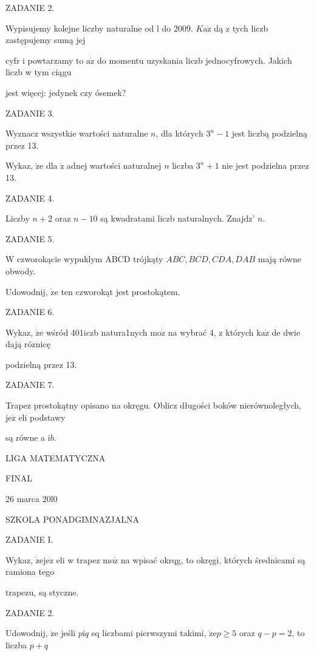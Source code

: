 \documentclass[a4paper,12pt]{article}
\begin{document}
ZADANIE 2.

Wypisujemy kolejne liczby naturalne od l do 2009. $K\mathrm{a}\dot{\mathrm{z}}$ dą z tych liczb zastępujemy sumą jej

cyfr i powtarzamy to $\mathrm{a}\dot{\mathrm{z}}$ do momentu uzyskania liczb jednocyfrowych. Jakich liczb w tym ciągu

jest więcej: jedynek czy ósemek?

ZADANIE 3.

Wyznacz wszystkie wartości naturalne $n$, dla których $3^{n}-1$ jest liczbą podzielną przez 13.

Wykaz, $\dot{\mathrm{z}}\mathrm{e}$ dla $\dot{\mathrm{z}}$ adnej wartości naturalnej $n$ liczba $3^{n}+1$ nie jest podzielna przez 13.

ZADANIE 4.

Liczby $n+2$ oraz $n-10$ są kwadratami liczb naturalnych. Znajdz' $n.$

ZADANIE 5.

$\mathrm{W}$ czworokącie wypuklym ABCD trójkąty $ABC, BCD, CDA, DAB$ mają równe obwody.

Udowodnij, $\dot{\mathrm{z}}\mathrm{e}$ ten czworokąt jest prostokątem.

ZADANIE 6.

Wykaz, $\dot{\mathrm{z}}\mathrm{e}$ wśród 401iczb natura1nych $\mathrm{m}\mathrm{o}\dot{\mathrm{z}}$ na wybrać 4, z których $\mathrm{k}\mathrm{a}\dot{\mathrm{z}}$ de dwie dają róznicę

podzielną przez 13.

ZADANIE 7.

Trapez prostokątny opisano na okręgu. Oblicz długości boków nierównoległych, $\mathrm{j}\mathrm{e}\dot{\mathrm{z}}$ eli podstawy

są równe a $\mathrm{i}b.$






LIGA MATEMATYCZNA

FINAL

26 marca 20l0

SZKOLA PONADGIMNAZJALNA

ZADANIE I.

Wykaz, $\dot{\mathrm{z}}\mathrm{e}\mathrm{j}\mathrm{e}\dot{\mathrm{z}}$ eli w trapez $\mathrm{m}\mathrm{o}\dot{\mathrm{z}}$ na wpisać okrqg, to okręgi, których średnicami są ramiona tego

trapezu, są styczne.

ZADANIE 2.

Udowodnij, $\dot{\mathrm{z}}\mathrm{e}$ jeśli $p\mathrm{i}q$ sq liczbami pierwszymi takimi, $\dot{\mathrm{z}}\mathrm{e}p\geq 5$ oraz $q-p=2$, to liczba $p+q$
\end{document}
